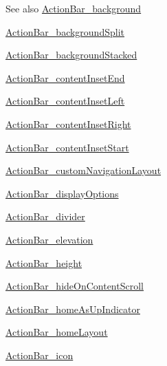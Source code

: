 \begin{DoxySeeAlso}{See also}
\hyperlink{classproject4_1_1xaria_1_1R_1_1styleable_ad5297d7335b655c3a7281371b07c92d4}{Action\+Bar\+\_\+background} 

\hyperlink{classproject4_1_1xaria_1_1R_1_1styleable_a0a05b0d40453638b3b59df9b162097ec}{Action\+Bar\+\_\+background\+Split} 

\hyperlink{classproject4_1_1xaria_1_1R_1_1styleable_aff562ad353237ec535896356fc27af79}{Action\+Bar\+\_\+background\+Stacked} 

\hyperlink{classproject4_1_1xaria_1_1R_1_1styleable_a89330126d297ac16f0e2a9dcfeaad358}{Action\+Bar\+\_\+content\+Inset\+End} 

\hyperlink{classproject4_1_1xaria_1_1R_1_1styleable_a1b56e7090c35d8a347e0df70c0835624}{Action\+Bar\+\_\+content\+Inset\+Left} 

\hyperlink{classproject4_1_1xaria_1_1R_1_1styleable_a214d077d9e00a3988b431a70cd90e71e}{Action\+Bar\+\_\+content\+Inset\+Right} 

\hyperlink{classproject4_1_1xaria_1_1R_1_1styleable_a9212bf97d9d5252fd23d430335413682}{Action\+Bar\+\_\+content\+Inset\+Start} 

\hyperlink{classproject4_1_1xaria_1_1R_1_1styleable_aa80da3fcac263c12efd759fb11979cc7}{Action\+Bar\+\_\+custom\+Navigation\+Layout} 

\hyperlink{classproject4_1_1xaria_1_1R_1_1styleable_a656add89aebf98d754b0482202026647}{Action\+Bar\+\_\+display\+Options} 

\hyperlink{classproject4_1_1xaria_1_1R_1_1styleable_aa7f5948a8f73f6442f4be22fae96c835}{Action\+Bar\+\_\+divider} 

\hyperlink{classproject4_1_1xaria_1_1R_1_1styleable_a538cdc9cda0d9026935ab8949327a1a4}{Action\+Bar\+\_\+elevation} 

\hyperlink{classproject4_1_1xaria_1_1R_1_1styleable_acac776d934e00d7cc5f0250a0d027a24}{Action\+Bar\+\_\+height} 

\hyperlink{classproject4_1_1xaria_1_1R_1_1styleable_a7689152e199aa4b0e5ce73fa3c45f32e}{Action\+Bar\+\_\+hide\+On\+Content\+Scroll} 

\hyperlink{classproject4_1_1xaria_1_1R_1_1styleable_ab5053df37af5d2ea8d603211b589c775}{Action\+Bar\+\_\+home\+As\+Up\+Indicator} 

\hyperlink{classproject4_1_1xaria_1_1R_1_1styleable_a3c2746f97e4f1d93ae4fd7b0a94e055c}{Action\+Bar\+\_\+home\+Layout} 

\hyperlink{classproject4_1_1xaria_1_1R_1_1styleable_ac5aaeb633d4d1312de58e956afac37b1}{Action\+Bar\+\_\+icon} 


\end{DoxySeeAlso}
